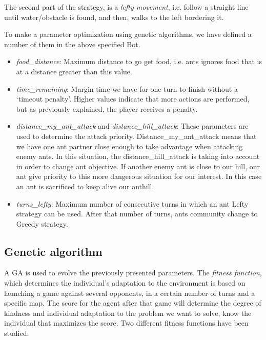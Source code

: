 \documentclass[runningheads]{llncs}
\begin{document}
The second part of the strategy, is a \textit{lefty movement}, i.e. follow a straight line until water/obstacle is found, and then, walks to the left bordering it.

 
To make a parameter optimization using genetic algorithms, we have defined a number of them in the above specified Bot. 

\begin{itemize}
  \item {\em food\_distance}: Maximum distance to go get food, i.e. ants ignores food that is at a distance greater than this value.
  \item {\em time\_remaining}: Margin time we have for one turn to finish without a `timeout penalty'. Higher values indicate that more actions are performed, but as previously explained, the player receives a penalty.
  \item {\em distance\_my\_ant\_attack} and {\em distance\_hill\_attack}: These parameters are used to determine the attack priority.  Distance\_my\_ant\_attack means that we have one ant partner close enough to take advantage when attacking enemy ants. In this situation, the distance\_hill\_attack is taking into account in order to change ant objective. If another enemy ant is close to our hill, our ant give priority to this more dangerous situation for our interest. In this case an ant is sacrificed to keep alive our anthill.
  \item {\em turns\_lefty}: Maximum number of consecutive turns in which an ant Lefty strategy can be used. After that number of turns, ants community change to Greedy strategy.

\end{itemize}

\subsection{Genetic algorithm}
A GA is used to evolve the previously presented parameters. The \textit{fitness function}, which determines the individual's adaptation to the environment is based on launching a game against several opponents, in a certain number of turns and a specific map.
The score for the agent after that game will determine the degree of kindness and individual adaptation to the problem we want to solve, know the individual that maximizes the score. Two different fitness functions have been studied:
\end{document}
